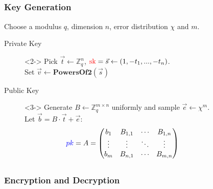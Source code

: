 \documentclass[lualatex, 9pt,serif]{beamer}
\newcommand{\red}[1]{
\ifmmode \text{\textcolor{red}{#1}}
\else \textcolor{red}{#1}
\fi
}
\newcommand{\blue}[1]{
	\ifmmode \text{\textcolor{blue}{#1}}
	\else \textcolor{blue}{#1}
	\fi
}
\newenvironment{cframe}[1]{
\begin{frame}
\frametitle{#1} } 
{
\end{frame}
}
\begin{document}
\subsection[Key Generation]{}
\begin{cframe}{Key Generation}
	Choose a modulus $q$, dimension $n$, error distribution $\chi$ and $m$.

	\begin{description}
		\item[Private Key]<2-> Pick $\vec{t} \leftarrow \mathbb{Z}^n_q$, $\red{sk} = \vec{s} \leftarrow (1,-t_1,...,-t_n)$.\\Set $\vec{v}  \leftarrow \mathbf{PowersOf2}(\vec{s})$\\[0.5cm]
		\item[Public Key]<3-> Generate $B \leftarrow \mathbb{Z}_q^{m\times n} $ uniformly and sample $\vec{e} \leftarrow \chi^m$.\\ Let $\vec{b} = B \cdot  \vec{t} + \vec{e}$:\\
		
		\begin{align*}
		\blue{pk} = A = \begin{pmatrix}
		b_1 & B_{1,1} & \cdots & B_{1,n} \\
		\vdots & \vdots & \ddots & \vdots \\
		b_m & B_{n,1} & \cdots & B_{m,n}
		\end{pmatrix}\hspace*{2cm}
		\end{align*}
	\end{description}
\end{cframe}

\subsection[Dec/Encryption]{}

\begin{cframe}{Encryption and Decryption}
	\begin{overprint}
		
		\onslide<3->{
			Note: $\vec{v}_{0,...,l} = (1,2,...,2^{l-1})$. Let $v_i = 2^i \in (\frac{q}{4},\frac{q}{2}]$.\\\visible<4->{ Small plaintext (e.g $\mu \in \{0,1\}$) recovery:
			\begin{align*}
			\mathbf{Dec}(C,sk) = \visible<5->{\left\lfloor \frac{\left\langle C_i,\vec{v} \right\rangle}{v_i} \right\rceil
			&= \left\lfloor \frac{(C \cdot  \vec{v})_i}{v_i} \right\rceil}
			\end{align*}}
			\visible<6->{General Method: \cite{micciancio2012trapdoors}}
		}
	\end{overprint}
\end{cframe}
\end{document}
